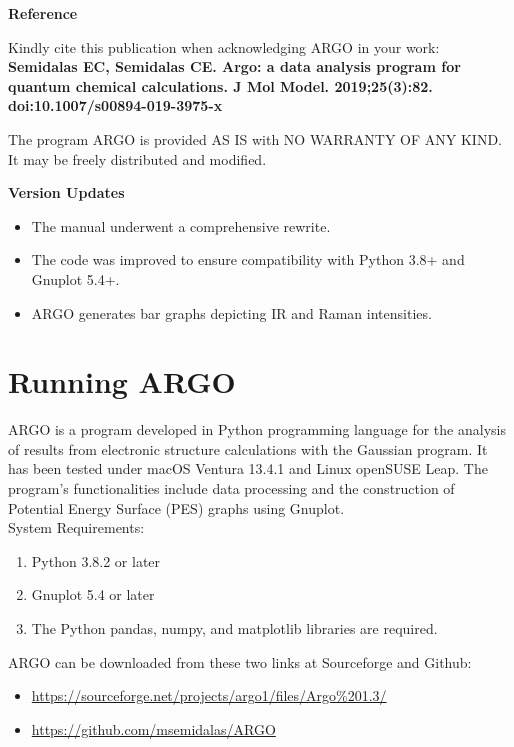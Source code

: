 \documentclass[12pt]{article}
\begin{document}
\vspace{2cm}
\normalsize
\textbf{Reference} \par
\vspace{0.5cm}

Kindly cite this publication when acknowledging ARGO\cite{Semidalas2019b} in your work:\\

\textbf{Semidalas EC, Semidalas CE. Argo: a data analysis program for quantum chemical calculations. J Mol Model. 2019;25(3):82. doi:10.1007/s00894-019-3975-x}


\vfill
\justifying
The program ARGO is provided AS IS with NO WARRANTY OF ANY KIND. It may be freely distributed and modified.
\newpage
\tableofcontents

\vspace{3cm}
\textbf{Version Updates}
\begin{itemize}
    \item The manual underwent a comprehensive rewrite.
    \item The code was improved to ensure compatibility with Python 3.8+ and Gnuplot 5.4+.
    \item ARGO generates bar graphs depicting IR and Raman intensities.
\end{itemize}
\clearpage
\newpage

\section{Running ARGO}
ARGO is a program developed in Python programming language for the analysis of results from electronic structure calculations with the Gaussian program. It has been tested under macOS Ventura 13.4.1 and Linux openSUSE Leap. The program's functionalities include data processing and the construction of Potential Energy Surface (PES) graphs using Gnuplot.\\

System Requirements:
    \begin{enumerate}
        \item Python 3.8.2 or later
        \item Gnuplot 5.4 or later
        \item The Python pandas, numpy, and matplotlib libraries are required.
    \end{enumerate}

ARGO can be downloaded from these two links at Sourceforge and Github:
\begin{itemize}
    \item \url{https://sourceforge.net/projects/argo1/files/Argo%201.3/}
    \item \url{https://github.com/msemidalas/ARGO}
\end{itemize}
\end{document}
